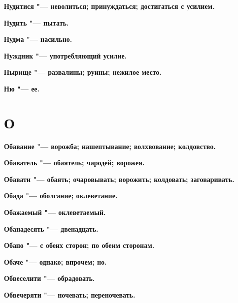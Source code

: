 \begin{mymulticols}{2}
\bfseries Нудитися\normalfont{} "--- неволиться; принуждаться; достигаться с усилием. 




\bfseries Нудить\normalfont{} "--- пытать. 




\bfseries Нудма\normalfont{} "--- насильно. 




\bfseries Нуждник\normalfont{} "--- употребляющий усилие. 




\bfseries Нырище\normalfont{} "--- развалины; руины; нежилое место. 




\bfseries Ню\normalfont{} "--- ее. 




\section{О}





\bfseries Обавание\normalfont{} "--- ворожба; нашептывание; волхвование; колдовство. 




\bfseries Обаватель\normalfont{} "--- обаятель; чародей; ворожея. 




\bfseries Обавати\normalfont{} "--- обаять; очаровывать; ворожить; колдовать; заговаривать. 




\bfseries Обада\normalfont{} "--- оболгание; оклеветание. 




\bfseries Обажаемый\normalfont{} "--- оклеветаемый. 




\bfseries Обанадесять\normalfont{} "--- двенадцать. 




\bfseries Обапо\normalfont{} "--- с обеих сторон; по обеим сторонам. 




\bfseries Обаче\normalfont{} "--- однако; впрочем; но. 




\bfseries Обвеселити\normalfont{} "--- обрадовать. 




\bfseries Обвечеряти\normalfont{} "--- ночевать; переночевать. 





\end{mymulticols}
